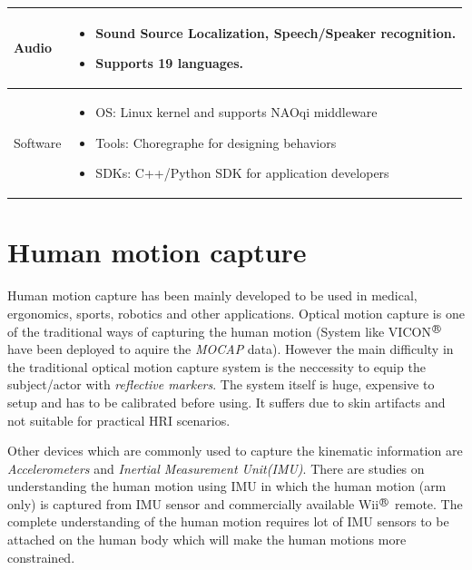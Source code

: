 \begin{table}[H]
\begin{tabular}{ | l | p{12cm} |}
  Audio & \begin{itemize}[leftmargin=*,topsep={0pt},itemsep={0pt},partopsep={0pt},parsep={0pt}] \item Sound Source Localization, Speech/Speaker recognition. \item Supports 19 languages.\end{itemize} \\
                                          \hline
  Software & \begin{itemize}[leftmargin=*,topsep={0pt},itemsep={0pt},partopsep={0pt},parsep={0pt}] \item OS: Linux kernel and supports NAOqi middleware
  							\item Tools: Choregraphe \cite{pot2009choregraphe} for designing behaviors
  							\item SDKs: C++/Python SDK for application developers \end{itemize} \\
                                          \hline
    \end{tabular}
\end{table}

\section{Human motion capture}
Human motion capture has been mainly developed to be used in medical, ergonomics, sports, robotics and other applications. Optical motion capture is one of the traditional ways of capturing the human motion (System like VICON$^{\regmark}$ have been deployed to aquire the \emph{MOCAP} data). However the main difficulty in the traditional optical motion capture system is the neccessity to equip the subject/actor with \emph{reflective markers}. The system itself is huge, expensive to setup and has to be calibrated before using. It suffers due to skin artifacts and not suitable for practical HRI scenarios. 
	
Other devices which are commonly used to capture the kinematic information are \emph{Accelerometers} and \emph{Inertial Measurement Unit(IMU)}. There are studies on understanding the human motion using IMU \cite{aoki2013segmentation} in which the human motion (arm only) is captured from IMU sensor and commercially available Wii$^{\regmark}$ remote. The complete understanding of the human motion requires lot of IMU sensors to be attached on the human body which will make the human motions more constrained. 

